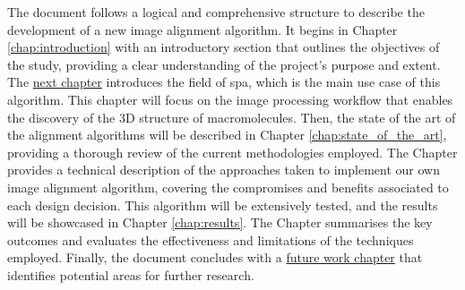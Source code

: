 \documentclass[../main.tex]{subfiles}
\begin{document}
The document follows a logical and comprehensive structure to describe the development of a new image alignment algorithm. It begins in Chapter \ref{chap:introduction} with an introductory section that outlines the objectives of the study, providing a clear understanding of the project's purpose and extent. The \hyperlink{chap:spa}{next chapter} introduces the field of \gls{spa}, which is the main use case of this algorithm. This chapter will focus on the image processing workflow that enables the discovery of the 3D structure of macromolecules. Then, the state of the art of the alignment algorithms will be described in Chapter \ref{chap:state_of_the_art}, providing a thorough review of the current methodologies employed. The  Chapter provides a technical description of the approaches taken to implement our own image alignment algorithm, covering the compromises and benefits associated to each design decision. This algorithm will be extensively tested, and the results will be showcased in Chapter \ref{chap:results}. The  Chapter summarises the key outcomes and evaluates the effectiveness and limitations of the techniques employed. Finally, the document concludes with a \hyperlink{chap:future}{future work chapter} that identifies potential areas for further research.
\end{document}
